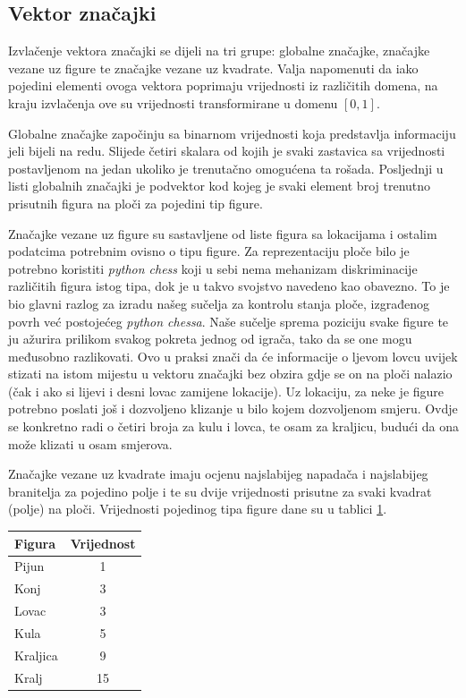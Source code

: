 \documentclass[journal]{IEEEtran}
\begin{document}
\subsection{Vektor značajki}
Izvlačenje vektora značajki se dijeli na tri grupe: globalne značajke, značajke vezane uz figure te značajke vezane uz kvadrate. Valja napomenuti da iako pojedini elementi ovoga vektora poprimaju vrijednosti iz različitih domena, na kraju izvlačenja ove su vrijednosti transformirane u domenu $\left[0,1\right]$.
\par
Globalne značajke započinju sa binarnom vrijednosti koja predstavlja informaciju jeli bijeli na redu. Slijede četiri skalara od kojih je svaki zastavica sa vrijednosti postavljenom na jedan ukoliko je trenutačno omogućena ta rošada. Posljednji u listi globalnih značajki je podvektor kod kojeg je svaki element broj trenutno prisutnih figura na ploči za pojedini tip figure.
\par
Značajke vezane uz figure su sastavljene od liste figura sa lokacijama i ostalim podatcima potrebnim ovisno o tipu figure. Za reprezentaciju ploče bilo je potrebno koristiti \textit{python chess} koji u sebi nema mehanizam diskriminacije različitih figura istog tipa, dok je u \cite{giraffe} takvo svojstvo navedeno kao obavezno. To je bio glavni razlog za izradu našeg sučelja za kontrolu stanja ploče, izgrađenog povrh već postojećeg \textit{python chessa}. Naše sučelje sprema poziciju svake figure te ju ažurira prilikom svakog pokreta jednog od igrača, tako da se one mogu međusobno razlikovati. Ovo u praksi znači da će informacije o ljevom lovcu uvijek stizati na istom mijestu u vektoru značajki bez obzira gdje se on na ploči nalazio (čak i ako si lijevi i desni lovac zamijene lokacije). Uz lokaciju, za neke je figure potrebno poslati još i dozvoljeno klizanje u bilo kojem dozvoljenom smjeru. Ovdje se konkretno radi o četiri broja za kulu i lovca, te osam za kraljicu, budući da ona može klizati u osam smjerova.
\par
Značajke vezane uz kvadrate imaju ocjenu najslabijeg napadača i najslabijeg branitelja za pojedino polje i te su dvije vrijednosti prisutne za svaki kvadrat (polje) na ploči. Vrijednosti pojedinog tipa figure dane su u tablici \ref{tab:vrijednosti}.
\begin{table}[]
\centering
{}
\label{tab:vrijednosti}
\begin{tabular}{lc}
\textbf{Figura} & \multicolumn{1}{l}{\textbf{Vrijednost}} \\ \hline
Pijun           & 1                                       \\
Konj            & 3                                       \\
Lovac           & 3                                       \\
Kula            & 5                                       \\
Kraljica        & 9                                       \\
Kralj           & 15                                     
\end{tabular}
\end{table}
\end{document}
